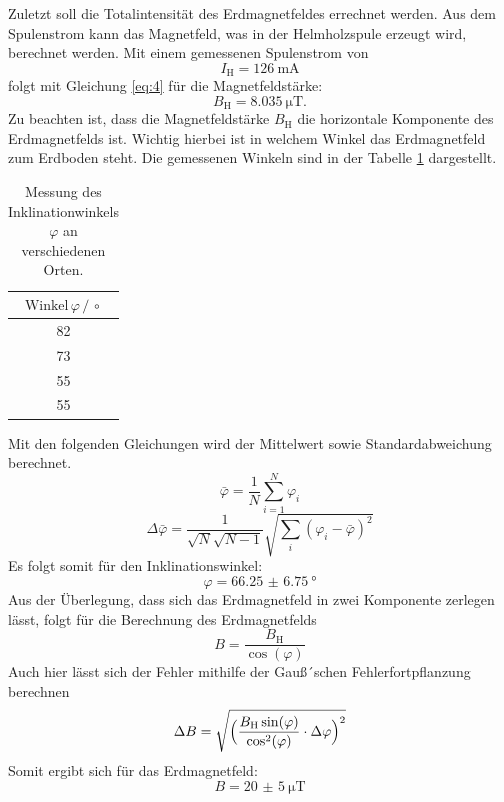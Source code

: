 Zuletzt soll die Totalintensität des Erdmagnetfeldes errechnet werden.
Aus dem Spulenstrom kann das Magnetfeld, was in der Helmholzspule erzeugt wird,
berechnet werden.
Mit einem gemessenen Spulenstrom von
\begin{equation*}
  I_\text{H} =\SI{126}{\milli\ampere}
\end{equation*}
folgt mit Gleichung \ref{eq:4} für die Magnetfeldstärke:
\begin{equation*}
  B_\text{H} =\SI{8.035}{\micro\tesla}.
\end{equation*}
Zu beachten ist, dass die Magnetfeldstärke $B_\text{H}$ die horizontale Komponente des Erdmagnetfelds ist.
Wichtig hierbei ist in welchem Winkel das Erdmagnetfeld zum Erdboden steht.
Die gemessenen Winkeln sind in der Tabelle \ref{tab:7} dargestellt.
\begin{table}[H]
  \centering
  \caption{Messung des Inklinationwinkels $\varphi$ an verschiedenen Orten.}
  \label{tab:7}
  \begin{tabular}{c}
\toprule
$\text{Winkel}\, \varphi \,/\, \circ$\\
\midrule
82\\
73\\
55\\
55\\
\bottomrule
  \end{tabular}
\end{table}
Mit den folgenden Gleichungen wird der Mittelwert sowie Standardabweichung berechnet.
\begin{equation*}
  \bar{\varphi}= \frac{1}{N} \sum_{i=1}^{N} \varphi_{i}
\end{equation*}
\begin{equation*}
\Delta \bar{\varphi} = \frac{1}{\sqrt{N}\sqrt{N-1}} \sqrt{\sum_{i}(\varphi_{i}-\bar{\varphi})^2}
\end{equation*}
Es folgt somit für den Inklinationswinkel:
\begin{equation*}
  \varphi = \SI{66.25(675)}{\degree}
\end{equation*}
Aus der Überlegung, dass sich das Erdmagnetfeld in zwei Komponente zerlegen lässt, folgt für die Berechnung des Erdmagnetfelds
\begin{equation*}
  B = \frac{B_\text{H}}{\cos(\varphi)}
\end{equation*}
Auch hier lässt sich der Fehler mithilfe der Gauß´schen Fehlerfortpflanzung berechnen
\begin{equation*}
  \Delta B = \sqrt{\Bigl(\frac{B_\text{H} \sin(\varphi)}{\cos^2(\varphi)} \cdot \Delta \varphi\Bigr)^2}
\end{equation*}
Somit ergibt sich für das Erdmagnetfeld:
\begin{equation*}
  B= \SI{20(5)}{\micro\tesla}
\end{equation*}
